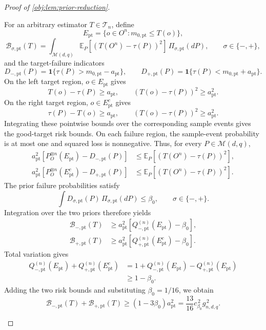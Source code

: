\documentclass[11pt]{article}
\begin{document}
\begin{proof}[Proof of \cref{obj:lem:prior-reduction}]
\begin{enumerate}
For an arbitrary estimator \(T\in\mathcal T_n\), define
\[
E_{\mathrm{pt}}
=\{o\in O^n:m_{0,\mathrm{pt}}\le T(o)\},
\]
\[
\mathcal B_{\sigma,\mathrm{pt}}(T)
=\int_{\mathcal M(d,q)}
  \mathbb E_P\!\left[(T(O^n)-\tau(P))^2\right]\,
  \Pi_{\sigma,\mathrm{pt}}(dP),
\qquad \sigma\in\{-,+\},
\]
and the target-failure indicators
\[
D_{-,\mathrm{pt}}(P)
=\mathbf1\{\tau(P)>m_{0,\mathrm{pt}}-a_{\mathrm{pt}}\},
\qquad
D_{+,\mathrm{pt}}(P)
=\mathbf1\{\tau(P)<m_{0,\mathrm{pt}}+a_{\mathrm{pt}}\}.
\]
On the left target region, \(o\in E_{\mathrm{pt}}\) gives
\[
T(o)-\tau(P)\ge a_{\mathrm{pt}},
\qquad
(T(o)-\tau(P))^2\ge a_{\mathrm{pt}}^2.
\]
On the right target region, \(o\in E_{\mathrm{pt}}^c\) gives
\[
\tau(P)-T(o)\ge a_{\mathrm{pt}},
\qquad
(T(o)-\tau(P))^2\ge a_{\mathrm{pt}}^2.
\]
Integrating these pointwise bounds over the corresponding sample events
gives the good-target risk bounds. On each failure region, the sample-event
probability is at most one and squared loss is nonnegative. Thus, for every
\(P\in\mathcal M(d,q)\),
\[
\begin{aligned}
a_{\mathrm{pt}}^2
\left[P_O^{\otimes n}(E_{\mathrm{pt}})-D_{-,\mathrm{pt}}(P)\right]
&\le \mathbb E_P[(T(O^n)-\tau(P))^2],\\
a_{\mathrm{pt}}^2
\left[P_O^{\otimes n}(E_{\mathrm{pt}}^c)-D_{+,\mathrm{pt}}(P)\right]
&\le \mathbb E_P[(T(O^n)-\tau(P))^2].
\end{aligned}
\]
The prior failure probabilities satisfy
\[
\int D_{\sigma,\mathrm{pt}}(P)\,
  \Pi_{\sigma,\mathrm{pt}}(dP)\le\beta_0,
\qquad \sigma\in\{-,+\}.
\]
Integration over the two priors therefore yields
\[
\begin{aligned}
\mathcal B_{-,\mathrm{pt}}(T)
&\ge a_{\mathrm{pt}}^2
 \left[Q_{-,\mathrm{pt}}^{(n)}(E_{\mathrm{pt}})-\beta_0\right],\\
\mathcal B_{+,\mathrm{pt}}(T)
&\ge a_{\mathrm{pt}}^2
 \left[Q_{+,\mathrm{pt}}^{(n)}(E_{\mathrm{pt}}^c)-\beta_0\right].
\end{aligned}
\]
Total variation gives
\[
\begin{aligned}
Q_{-,\mathrm{pt}}^{(n)}(E_{\mathrm{pt}})
+Q_{+,\mathrm{pt}}^{(n)}(E_{\mathrm{pt}}^c)
&=1+Q_{-,\mathrm{pt}}^{(n)}(E_{\mathrm{pt}})
     -Q_{+,\mathrm{pt}}^{(n)}(E_{\mathrm{pt}})\\
&\ge1-\beta_0.
\end{aligned}
\]
Adding the two risk bounds and substituting \(\beta_0=1/16\), we obtain
\[
\mathcal B_{-,\mathrm{pt}}(T)+\mathcal B_{+,\mathrm{pt}}(T)
\ge (1-3\beta_0)a_{\mathrm{pt}}^2
=\frac{13}{16}c_{\beta_0}^{\,2}g_{n,d,q}^{\,2}.
\]
\end{enumerate}
\end{proof}
\end{document}
